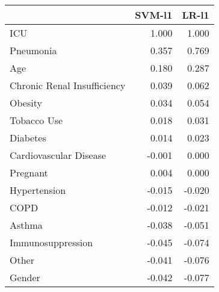 \begin{tabular}{lrr}
\toprule
{} &  SVM-l1 &  LR-l1 \\
\midrule
ICU                         &   1.000 &  1.000 \\
Pneumonia                   &   0.357 &  0.769 \\
Age                         &   0.180 &  0.287 \\
Chronic Renal Insufficiency &   0.039 &  0.062 \\
Obesity                     &   0.034 &  0.054 \\
Tobacco Use                 &   0.018 &  0.031 \\
Diabetes                    &   0.014 &  0.023 \\
Cardiovascular Disease      &  -0.001 &  0.000 \\
Pregnant                    &   0.004 &  0.000 \\
Hypertension                &  -0.015 & -0.020 \\
COPD                        &  -0.012 & -0.021 \\
Asthma                      &  -0.038 & -0.051 \\
Immunosuppression           &  -0.045 & -0.074 \\
Other                       &  -0.041 & -0.076 \\
Gender                      &  -0.042 & -0.077 \\
\bottomrule
\end{tabular}
